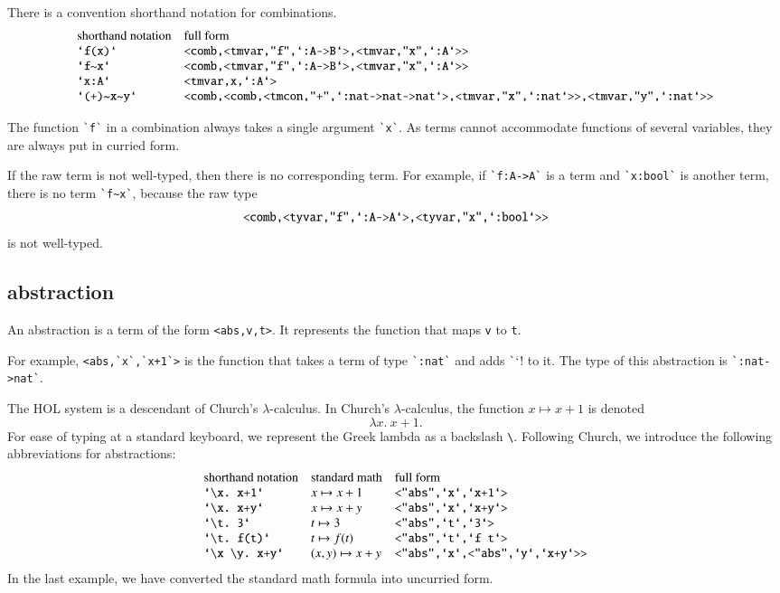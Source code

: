 There is a convention shorthand notation for combinations.
$$
\begin{array}{lll}
\hbox{shorthand notation}&\hbox{full form}\\
\verb!`f(x)`! & \verb!<comb,<tmvar,"f",`:A->B`>,<tmvar,"x",`:A`>>!\\
\verb!`f~x`! & \verb!<comb,<tmvar,"f",`:A->B`>,<tmvar,"x",`:A`>>!\\
\verb!`x:A`!&\verb!<tmvar,x,`:A`>!\\
\verb!`(+)~x~y`! & \verb!<comb,<comb,<tmcon,"+",`:nat->nat->nat`>,<tmvar,"x",`:nat`>>,<tmvar,"y",`:nat`>>!\\
\end{array}
$$

The function \verb!`f`! in a combination always takes a single argument \verb!`x`!.  As terms cannot accommodate functions of several variables, they are always put in curried form.

If the raw term is not well-typed, then there is no corresponding term.  For example, if \verb!`f:A->A`! is a term and
\verb!`x:bool`! is another term, there is no term \verb!`f~x`!, because the raw type
$$
\verb!<comb,<tyvar,"f",`:A->A`>,<tyvar,"x",`:bool`>>!
$$
is not well-typed.

\subsection{abstraction}

An abstraction is a term of the form \verb!<abs,v,t>!.  It
represents the function that maps \verb!v! to \verb!t!.

For example, \verb!<abs,`x`,`x+1`>! is the function that
takes a term of type \verb!`:nat`! and adds \verb!`!`! to
it.  The type of this abstraction is \verb!`:nat->nat`!.

The HOL system is a descendant of Church's $\lambda$-calculus.
In Church's $\lambda$-calculus, the function $x\mapsto x+1$
is denoted
$$
\lambda x.~x+1.
$$
For ease of typing at a standard keyboard, we represent the Greek lambda as a backslash \verb!\!.
Following Church, we introduce the following abbreviations
for abstractions:
$$
\begin{array}{lll}
\hbox{shorthand notation}&\hbox{standard math}&\hbox{full form}\\
\verb!`\x. x+1`!&x\mapsto x+1&\verb!<"abs",`x`,`x+1`>!\\
\verb!`\x. x+y`!&x\mapsto x+y&\verb!<"abs",`x`,`x+y`>!\\
\verb!`\t. 3`!&t\mapsto 3&\verb!<"abs",`t`,`3`>!\\
\verb!`\t. f(t)`!&t\mapsto f(t)&\verb!<"abs",`t`,`f t`>!\\
\verb!`\x \y. x+y`!&(x,y)\mapsto x+y&\verb!<"abs",`x`,<"abs",`y`,`x+y`>>!\\
\end{array}
$$
In the last example, we have converted the standard math formula into uncurried form.

